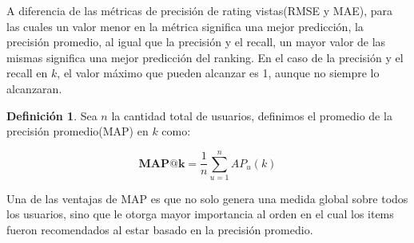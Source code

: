 \documentclass[hidelinks,12pt,a4paper]{book}
\theoremstyle{plain}
\theoremstyle{definition}
\newtheorem{definicion}[theorem]{Definición} %
\begin{document}
A diferencia de las métricas de precisión de rating vistas(RMSE y MAE), para las cuales un valor menor en la métrica significa una mejor predicción, la precisión promedio, al igual que la precisión y el recall, un mayor valor de las mismas significa una mejor predicción del ranking. En el caso de la precisión y el recall en $k$, el valor máximo que pueden alcanzar es 1, aunque no siempre lo alcanzaran.

\begin{definicion}
Sea $n$ la cantidad total de usuarios, definimos el promedio de la precisión promedio(MAP) en $k$  como:

\begin{equation}
\label{err:map}
\textbf{MAP@k} = \frac{1}{n} \sum_{u=1}^{n} AP_u(k)
\end{equation}
\end{definicion}

Una de las ventajas de MAP es que no solo genera una medida global sobre todos los usuarios, sino que le otorga mayor importancia al orden en el cual los items fueron recomendados al estar basado en la precisión promedio.
\end{document}
